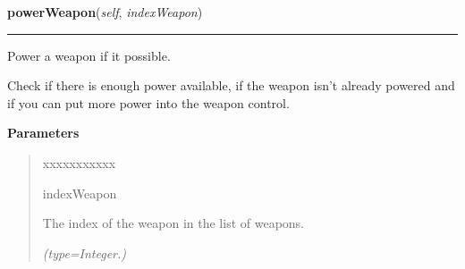 \hspace{.8\funcindent}\begin{boxedminipage}{\funcwidth}

    \raggedright \textbf{powerWeapon}(\textit{self}, \textit{indexWeapon})

    \vspace{-1.5ex}

    \rule{\textwidth}{0.5\fboxrule}
\setlength{\parskip}{2ex}
    Power a weapon if it possible.

    Check if there is enough power available, if the weapon isn't already 
    powered and if you can put more power into the weapon control.

\setlength{\parskip}{1ex}
      \textbf{Parameters}
      \vspace{-1ex}

      \begin{quote}
        \begin{Ventry}{xxxxxxxxxxx}

          \item[indexWeapon]

          The index of the weapon in the list of weapons.

            {\it (type=Integer.)}

        \end{Ventry}

      \end{quote}

    \end{boxedminipage}

    \label{systems:WeaponControl:unpowerWeapon}

    \vspace{0.5ex}

